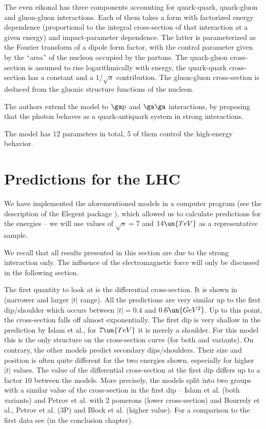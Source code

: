 The even eikonal has three components accounting for quark-quark, quark-gluon and gluon-gluon interactions. Each of them takes a form with factorized energy dependence (proportional to the integral cross-section of that interaction at a given energy) and impact-parameter dependence. The latter is parameterized as the Fourier transform of a dipole form factor, with the control parameter given by the ``area'' of the nucleon occupied by the partons. The quark-gluon cross-section is assumed to rise logarithmically with energy, the quark-quark cross-section has a constant and a $1/\sqrt s$ contribution. The gluon-gluon cross-section is deduced from the gluonic structure functions of the nucleon.

The authors extend the model to $\rm\ga p$ and $\rm\ga\ga$ interactions, by proposing that the photon behaves as a quark-antiquark system in strong interactions.

The model has 12 parameters in total, 5 of them control the high-energy behavior.

\section[el pred]{Predictions for the LHC}

We have implemented the aforementioned models in a computer program (see the description of the Elegent package ), which allowed us to calculate predictions for the  energies -- we will use values of $\sqrt s = 7$ and $14\un{TeV}$ as a representative sample.

We recall that all results presented in this section are due to the strong interaction only. The influence of the electromagnetic force will only be discussed in the following section.

The first quantity to look at is the differential cross-section. It is shown in  (narrower and larger $|t|$ range). All the predictions are very similar up to the first dip/shoulder which occurs between $|t| = 0.4$ and $0.6\un{GeV^2}$. Up to this point, the cross-section falls off almost exponentially. The first dip is very shallow in the prediction by Islam et al., for $7\un{TeV}$ it is merely a shoulder. For this model this is the only structure on the cross-section curve (for both  and  variants). On contrary, the other models predict secondary dips/shoulders. Their size and position is often quite different for the two energies shown, especially for higher $|t|$ values. The value of the differential cross-section at the first dip differs up to a factor $10$ between the models. More precisely, the models split into two groups with a similar value of the cross-section in the first dip -- Islam et al. (both variants) and Petrov et al. with 2 pomerons (lower cross-section) and Bourrely et al., Petrov et al. (3P) and Block et al. (higher value). For a comparison to the first  data see  (in the conclusion chapter).

